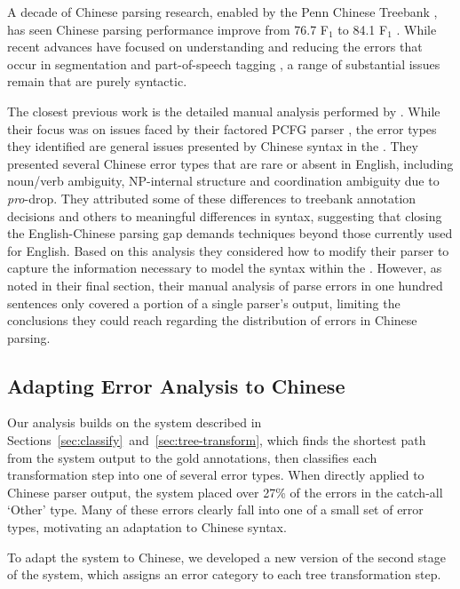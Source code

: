 A decade of Chinese parsing research, enabled by the Penn Chinese Treebank \parencite[\pctb;][]{Xue:2005:NLE}, has seen Chinese parsing performance improve from 76.7 F$_1$ \parencite{Bikel-Chiang:2000:CLP} to 84.1 F$_1$ \parencite{Qian-Liu:2012:EMNLP}.
While recent advances have focused on understanding and reducing the errors that occur in segmentation and part-of-speech tagging \parencite{Qian-Liu:2012:EMNLP,Jiang-etal:2009:ACL,Forst-Fang:2009:EACL}, a range of substantial issues remain that are purely syntactic.

The closest previous work is the detailed manual analysis performed by \textcite{Levy-Manning:2003:ACL}.
While their focus was on issues faced by their factored PCFG parser \parencite{Klein-Manning:2003:NIPS}, the error types they identified are general issues presented by Chinese syntax in the \pctb.
They presented several Chinese error types that are rare or absent in English, including noun/verb ambiguity, NP-internal structure and coordination ambiguity due to \emph{pro}-drop.
They attributed some of these differences to treebank annotation decisions and others to meaningful differences in syntax, suggesting that closing the English-Chinese parsing gap demands techniques beyond those currently used for English.
Based on this analysis they considered how to modify their parser to capture the information necessary to model the syntax within the \pctb.
However, as noted in their final section, their manual analysis of parse errors in one hundred sentences only covered a portion of a single parser's output, limiting the conclusions they could reach regarding the distribution of errors in Chinese parsing.

\subsection{Adapting Error Analysis to Chinese} \label{sec:adapting_automatic_error_analysis_to_chinese}

Our analysis builds on the system described in Sections~\ref{sec:classify}~and~\ref{sec:tree-transform}, which finds the shortest path from the system output to the gold annotations, then classifies each transformation step into one of several error types.
When directly applied to Chinese parser output, the system placed over 27\% of the errors in the catch-all `Other' type.
Many of these errors clearly fall into one of a small set of error types, motivating an adaptation to Chinese syntax.

To adapt the system to Chinese, we developed a new version of the second stage of the system, which assigns an error category to each tree transformation step.

